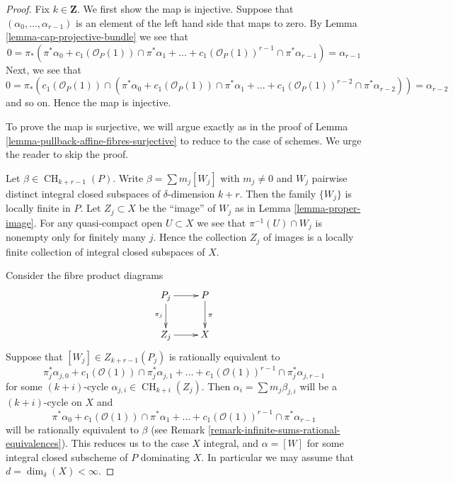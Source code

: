 \documentclass{stacks-project}
\theoremstyle{plain}
\theoremstyle{definition}
\theoremstyle{remark}
\numberwithin{equation}{subsection}
\def\CH{\mathop{\mathrm{CH}}\nolimits}
\begin{document}
\begin{proof}
Fix $k \in \mathbf{Z}$. We first show the map is injective.
Suppose that $(\alpha_0, \ldots, \alpha_{r - 1})$ is an element
of the left hand side that maps to zero.
By Lemma \ref{lemma-cap-projective-bundle} we see that
$$
0 = \pi_*(\pi^*\alpha_0 +
c_1(\mathcal{O}_P(1)) \cap \pi^*\alpha_1
+ \ldots +
c_1(\mathcal{O}_P(1))^{r - 1} \cap \pi^*\alpha_{r-1})
= \alpha_{r - 1}
$$
Next, we see that
$$
0 = \pi_*(c_1(\mathcal{O}_P(1)) \cap (\pi^*\alpha_0 +
c_1(\mathcal{O}_P(1)) \cap \pi^*\alpha_1
+ \ldots +
c_1(\mathcal{O}_P(1))^{r - 2} \cap \pi^*\alpha_{r - 2}))
= \alpha_{r - 2}
$$
and so on. Hence the map is injective.

\medskip\noindent
To prove the map is surjective, we will argue exactly
as in the proof of Lemma \ref{lemma-pullback-affine-fibres-surjective}
to reduce to the case of schemes.
We urge the reader to skip the proof.

\medskip\noindent
Let $\beta \in \CH_{k + r - 1}(P)$. Write $\beta = \sum m_j[W_j]$ with
$m_j \not = 0$ and $W_j$ pairwise distinct integral closed subspaces of
$\delta$-dimension $k + r$. Then the family $\{W_j\}$
is locally finite in $P$. Let $Z_j \subset X$ be the ``image''
of $W_j$ as in Lemma \ref{lemma-proper-image}. For any quasi-compact open
$U \subset X$ we see that $\pi^{-1}(U) \cap W_j$
is nonempty only for finitely many $j$. Hence the
collection $Z_j$ of images is a locally finite collection
of integral closed subspaces of $X$.

\medskip\noindent
Consider the fibre product diagrams
$$
\xymatrix{
P_j \ar[r] \ar[d]_{\pi_j} & P \ar[d]^\pi \\
Z_j \ar[r] & X
}
$$
Suppose that $[W_j] \in Z_{k + r - 1}(P_j)$
is rationally equivalent to
$$
\pi_j^*\alpha_{j, 0} +
c_1(\mathcal{O}(1)) \cap \pi_j^*\alpha_{j, 1} +
\ldots +
c_1(\mathcal{O}(1))^{r - 1} \cap \pi_j^*\alpha_{j, r - 1}
$$
for some $(k + i)$-cycle $\alpha_{j, i} \in \CH_{k + i}(Z_j)$. Then
$\alpha_i = \sum m_j \beta_{j, i}$ will be a $(k + i)$-cycle on $X$
and
$$
\pi^*\alpha_0 +
c_1(\mathcal{O}(1)) \cap \pi^*\alpha_1 +
\ldots +
c_1(\mathcal{O}(1))^{r - 1} \cap \pi^*\alpha_{r - 1}
$$
will be rationally equivalent to $\beta$ (see
Remark \ref{remark-infinite-sums-rational-equivalences}).
This reduces us to the case $X$ integral, and
$\alpha = [W]$ for some integral closed subscheme
of $P$ dominating $X$. In particular we may
assume that $d = \dim_\delta(X) < \infty$.


\end{proof}
\end{document}
